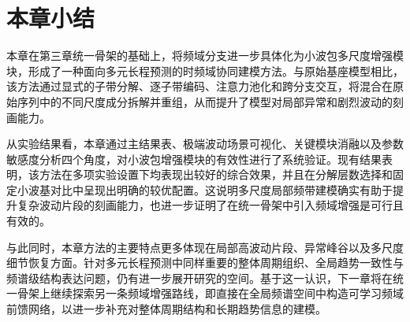 \section{本章小结}
本章在第三章统一骨架的基础上，将频域分支进一步具体化为小波包多尺度增强模块，形成了一种面向多元长程预测的时频域协同建模方法。与原始基座模型相比，该方法通过显式的子带分解、逐子带编码、注意力池化和跨分支交互，将混合在原始序列中的不同尺度成分拆解并重组，从而提升了模型对局部异常和剧烈波动的刻画能力。

从实验结果看，本章通过主结果表、极端波动场景可视化、关键模块消融以及参数敏感度分析四个角度，对小波包增强模块的有效性进行了系统验证。现有结果表明，该方法在多项实验设置下均表现出较好的综合效果，并且在分解层数选择和固定小波基对比中呈现出明确的较优配置。这说明多尺度局部频带建模确实有助于提升复杂波动片段的刻画能力，也进一步证明了在统一骨架中引入频域增强是可行且有效的。

与此同时，本章方法的主要特点更多体现在局部高波动片段、异常峰谷以及多尺度细节恢复方面。针对多元长程预测中同样重要的整体周期组织、全局趋势一致性与频谱级结构表达问题，仍有进一步展开研究的空间。基于这一认识，下一章将在统一骨架上继续探索另一条频域增强路线，即直接在全局频谱空间中构造可学习频域前馈网络，以进一步补充对整体周期结构和长期趋势信息的建模。


